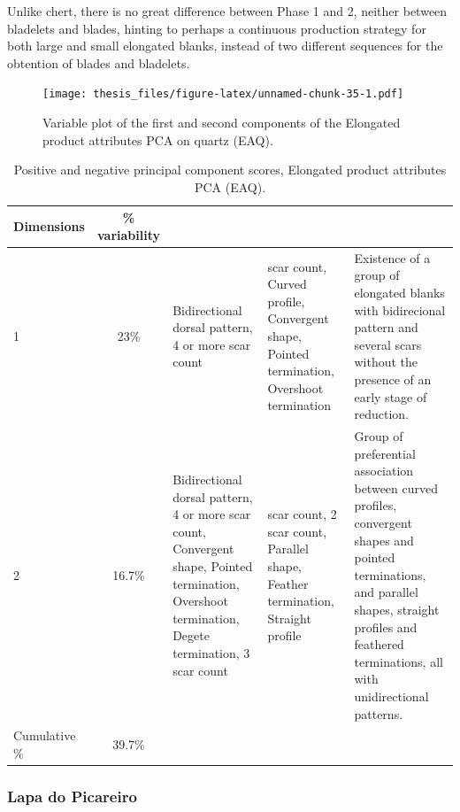 \documentclass[12pt,twoside]{reedthesis}
\begin{document}
Unlike chert, there is no great difference between Phase 1 and 2, neither between bladelets and blades, hinting to perhaps a continuous production strategy for both large and small elongated blanks, instead of two different sequences for the obtention of blades and bladelets.
\begin{figure}
\centering
\texttt{[image: thesis\_files/figure-latex/unnamed-chunk-35-1.pdf]}
\caption{\label{fig:unnamed-chunk-35}Variable plot of the first and second components of the Elongated product attributes PCA on quartz (EAQ).}
\end{figure}
\begin{table}[!h]

\caption{\label{tab:unnamed-chunk-36}Positive and negative principal component scores, Elongated product attributes PCA (EAQ).}
\centering
\begin{tabular}[t]{lc>{\raggedright\arraybackslash}p{3cm}>{\raggedright\arraybackslash}p{3cm}>{\raggedright\arraybackslash}p{3cm}}
\toprule
\multicolumn{1}{c}{\textbf{Dimensions}} & \multicolumn{1}{c}{\textbf{\% variability}} & \multicolumn{1}{>{\centering\arraybackslash}p{3cm}}{\textbf{+}} & \multicolumn{1}{>{\centering\arraybackslash}p{3cm}}{\textbf{-}} & \multicolumn{1}{>{\centering\arraybackslash}p{3cm}}{\textbf{Interpretation}}\\
\midrule
1 & 23\% & Bidirectional dorsal pattern, 4 or more scar count & 3 scar count, Curved profile, Convergent shape, Pointed termination, Overshoot termination & Existence of a group of elongated blanks with bidirecional pattern and several scars
                               without the presence of an early stage of reduction.\\
2 & 16.7\% & Bidirectional dorsal pattern, 4 or more scar count, Convergent shape, Pointed termination, Overshoot termination,
                               Degete termination, 3 scar count & 1 scar count, 2 scar count, Parallel shape, Feather termination, Straight profile & Group of preferential association between curved profiles, convergent shapes and pointed terminations, and parallel shapes, straight profiles and feathered terminations, all with unidirectional patterns.\\
Cumulative \% & 39.7\% &  &  & \\
\bottomrule
\end{tabular}
\end{table}
\hypertarget{lapa-do-picareiro-5}{%
\subsubsection{Lapa do Picareiro}\label{lapa-do-picareiro-5}}
\end{document}

